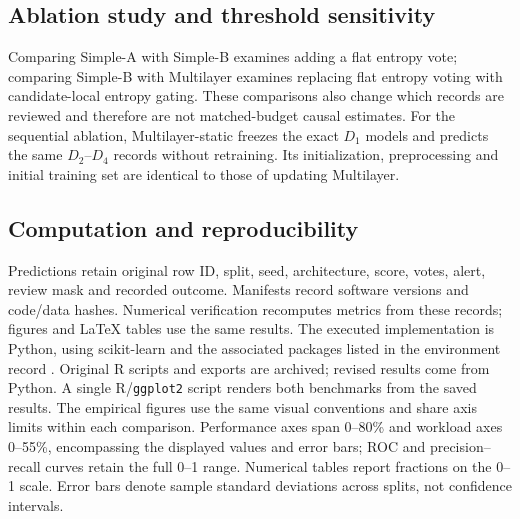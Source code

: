 \subsection{Ablation study and threshold sensitivity}\label{sec:ablation}
Comparing Simple-A with Simple-B examines adding a flat entropy vote;
comparing Simple-B with Multilayer examines replacing flat entropy voting
with candidate-local entropy gating. These comparisons also change which
records are reviewed and therefore are not matched-budget causal estimates.
For the sequential ablation, Multilayer-static freezes the exact $D_1$
models and predicts the same $D_2$--$D_4$ records without retraining.
Its initialization, preprocessing and initial training set are identical
to those of updating Multilayer.




\subsection{Computation and reproducibility}
Predictions retain original row ID, split, seed, architecture, score, votes,
alert, review mask and recorded outcome. Manifests record software versions
and code/data hashes. Numerical verification recomputes metrics from these
records; figures and LaTeX tables use the same results.
The executed implementation is Python, using scikit-learn and the associated
packages listed in the environment record \citep{Pedregosa2011}.
Original R scripts and exports are archived; revised results come from Python.
A single R/\texttt{ggplot2} script renders both benchmarks from the saved
results. The empirical figures use the same visual conventions and share
axis limits within each comparison. Performance axes span 0--80\% and
workload axes 0--55\%, encompassing the displayed values and error bars;
ROC and precision--recall curves retain the full 0--1 range. Numerical
tables report fractions on the 0--1 scale. Error bars denote sample
standard deviations across splits, not confidence intervals.

